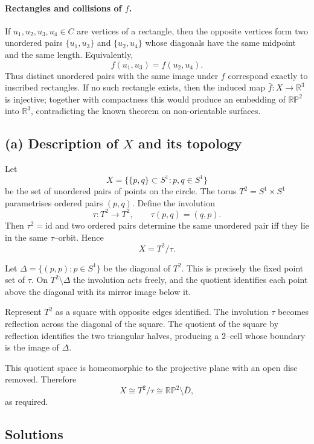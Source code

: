 \documentclass[12pt,a4paper]{article}
\theoremstyle{plain}
\theoremstyle{definition}      %
\begin{document}
\paragraph{Rectangles and collisions of $f$.}
If $u_{1},u_{2},u_{3},u_{4}\in C$ are vertices of a rectangle, then the opposite
vertices form two unordered pairs $\{u_{1},u_{3}\}$ and $\{u_{2},u_{4}\}$
whose diagonals have the same midpoint and the same length.  Equivalently,
\[
f(u_{1},u_{3}) = f(u_{2},u_{4}).
\]
Thus distinct unordered pairs with the same image under $f$ correspond exactly
to inscribed rectangles.  If no such rectangle exists, then the induced map
$\bar f:X\to\mathbb{R}^{3}$ is injective; together with compactness this would
produce an embedding of $\mathbb{RP}^{2}$ into $\mathbb{R}^{3}$, contradicting
the known theorem on non-orientable surfaces.
	
	\subsection*{(a) Description of $X$ and its topology}
	
	Let
	\[
	X=\{\{p,q\}\subset S^{1} : p,q\in S^{1}\}
	\]
	be the set of unordered pairs of points on the circle.  The torus
	$T^{2}=S^{1}\times S^{1}$ parametrises ordered pairs $(p,q)$.
	Define the involution
	\[
	\tau : T^{2}\longrightarrow T^{2},\qquad \tau(p,q)=(q,p).
	\]
	Then $\tau^{2}=\mathrm{id}$ and two ordered pairs determine the same unordered
	pair iff they lie in the same $\tau$--orbit.  Hence
	\[
	X = T^{2}/\tau .
	\]
	
	Let $\Delta=\{(p,p):p\in S^{1}\}$ be the diagonal of $T^{2}$.  This is precisely
	the fixed point set of $\tau$.  On $T^{2}\setminus\Delta$ the involution acts
	freely, and the quotient identifies each point above the diagonal with its
	mirror image below it.
	
	Represent $T^{2}$ as a square with opposite edges identified.  The involution
	$\tau$ becomes reflection across the diagonal of the square.  The quotient of
	the square by reflection identifies the two triangular halves, producing a
	2--cell whose boundary is the image of $\Delta$.
	
	This quotient space is homeomorphic to the projective plane with an open disc
	removed.  Therefore
	\[
	X \cong T^{2}/\tau \cong \mathbb{RP}^{2}\setminus \overline{D},
	\]
	as required.
	
\subsection*{Solutions}
\end{document}

